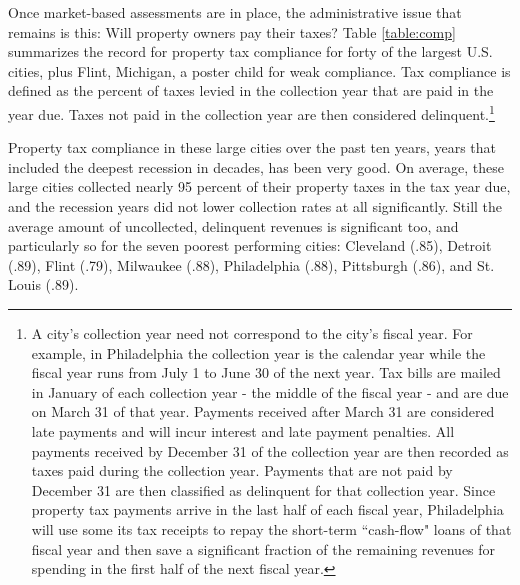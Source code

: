 \documentclass[12pt,titlepage]{article}
\begin{document}
Once market-based assessments are in place, the administrative issue
that remains is this: Will property owners pay their taxes?  Table \ref{table:comp}
summarizes the record for property tax compliance for forty of the
largest U.S. cities, plus Flint, Michigan, a poster child for weak
compliance.  Tax compliance is defined as the percent of taxes levied
in the collection year that are paid in the year due.  Taxes not paid
in the collection year are then considered delinquent.\footnote{A
  city's collection year need not correspond to the city's fiscal
  year.  For example, in Philadelphia the collection year is the
  calendar year while the fiscal year runs from July 1 to June 30 of
  the next year.  Tax bills are mailed in January of each collection
  year - the middle of the fiscal year - and are due on March 31 of
  that year.  Payments received after March 31 are considered late
  payments and will incur interest and late payment penalties.  All
  payments received by December 31 of the collection year are then
  recorded as taxes paid during the collection year.  Payments that
  are not paid by December 31 are then classified as delinquent for
  that collection year.  Since property tax payments arrive in the
  last half of each fiscal year, Philadelphia will use some its tax
  receipts to repay the short-term ``cash-flow" loans of that fiscal
  year and then save a significant fraction of the remaining revenues
  for spending in the first half of the next fiscal year.}

Property tax compliance in these large cities over the past ten years,
years that included the deepest recession in decades, has been very
good.  On average, these large cities collected nearly 95 percent of
their property taxes in the tax year due, and the recession years did
not lower collection rates at all significantly.
Still the average amount of uncollected, delinquent revenues is
significant too, and particularly so for the seven poorest performing
cities: Cleveland (.85), Detroit (.89), Flint (.79), Milwaukee (.88),
Philadelphia (.88), Pittsburgh (.86), and St. Louis (.89).
\end{document}
